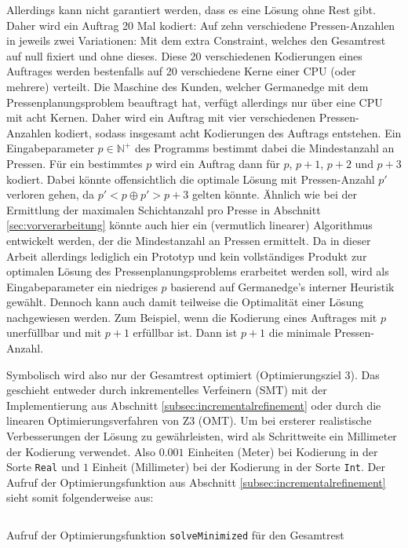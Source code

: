 Allerdings kann nicht garantiert werden, dass es eine Lösung ohne Rest gibt.
Daher wird ein Auftrag 20 Mal kodiert: Auf zehn verschiedene Pressen-Anzahlen in jeweils zwei Variationen:
Mit dem extra Constraint, welches den Gesamtrest auf null fixiert und ohne dieses.
Diese 20 verschiedenen Kodierungen eines Auftrages werden bestenfalls auf 20 verschiedene Kerne einer CPU (oder mehrere) verteilt.
Die Maschine des Kunden, welcher Germanedge mit dem Pressenplanungsproblem beauftragt hat, verfügt allerdings nur über eine CPU mit acht Kernen.
Daher wird ein Auftrag mit vier verschiedenen Pressen-Anzahlen kodiert, sodass insgesamt acht Kodierungen des Auftrags entstehen.
Ein Eingabeparameter $p \in \mathbb{N}^+$ des Programms bestimmt dabei die Mindestanzahl an Pressen.
Für ein bestimmtes $p$ wird ein Auftrag dann für $p$, $p+1$, $p+2$ und $p+3$ kodiert.
Dabei könnte offensichtlich die optimale Lösung mit Pressen-Anzahl $p\prime$ verloren gehen, da $p\prime < p \oplus p\prime > p + 3$ gelten könnte.
Ähnlich wie bei der Ermittlung der maximalen Schichtanzahl pro Presse in Abschnitt \ref{sec:vorverarbeitung} könnte auch hier ein
(vermutlich linearer) Algorithmus entwickelt werden, der die Mindestanzahl an Pressen ermittelt.
Da in dieser Arbeit allerdings lediglich ein Prototyp und kein vollständiges Produkt zur optimalen Lösung des Pressenplanungsproblems erarbeitet werden soll,
wird als Eingabeparameter ein niedriges $p$ basierend auf Germanedge's interner Heuristik gewählt.
Dennoch kann auch damit teilweise die Optimalität einer Lösung nachgewiesen werden.
Zum Beispiel, wenn die Kodierung eines Auftrages mit $p$ unerfüllbar und mit $p+1$ erfüllbar ist.
Dann ist $p+1$ die minimale Pressen-Anzahl.

Symbolisch wird also nur der Gesamtrest optimiert (Optimierungsziel 3).
Das geschieht entweder durch inkrementelles Verfeinern (SMT) mit der Implementierung aus Abschnitt \ref{subsec:incrementalrefinement} oder durch
die linearen Optimierungsverfahren von Z3 (OMT).
Um bei ersterer realistische Verbesserungen der Lösung zu gewährleisten, wird als Schrittweite ein Millimeter der Kodierung verwendet.
Also $0.001$ Einheiten (Meter) bei Kodierung in der Sorte \texttt{Real} und $1$ Einheit (Millimeter) bei der Kodierung in der Sorte \texttt{Int}.
Der Aufruf der Optimierungsfunktion aus Abschnitt \ref{subsec:incrementalrefinement} sieht somit folgenderweise aus:

\begin{listing}[H]
    \inputminted[linenos=true]{haskell}{Code/Implementierung/OptimizationTotalWaste.hs}
    \caption{Aufruf der Optimierungsfunktion \texttt{solveMinimized} für den Gesamtrest}
    \label{listing:solveminimized}
\end{listing}

